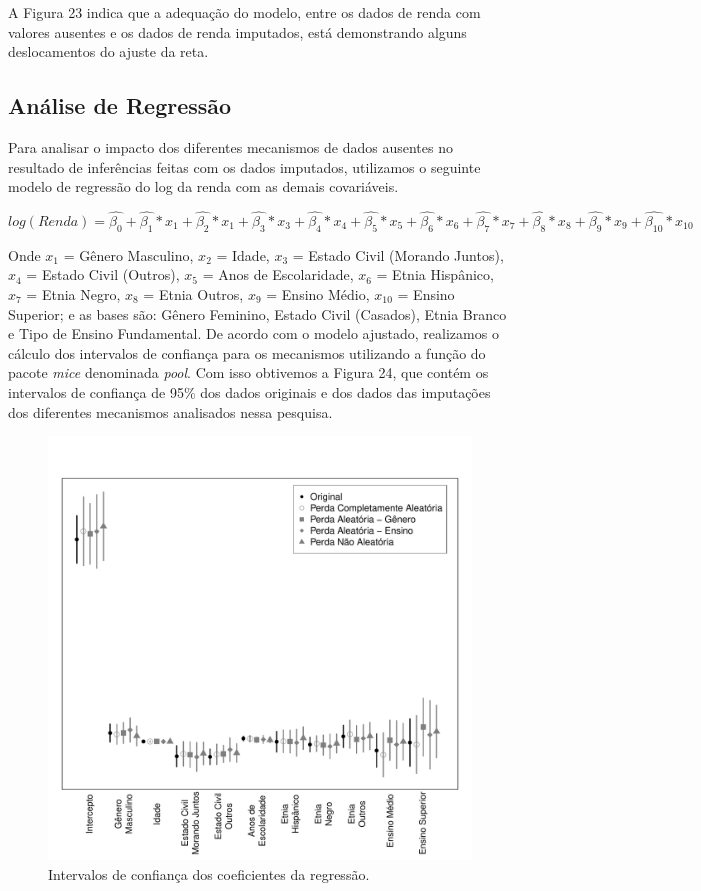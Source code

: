 \documentclass[]{article}
\begin{document}
A Figura 23 indica que a adequação do modelo, entre os dados de renda
com valores ausentes e os dados de renda imputados, está demonstrando
alguns deslocamentos do ajuste da reta.

\subsection{Análise de Regressão}\label{analise-de-regressao}

Para analisar o impacto dos diferentes mecanismos de dados ausentes no
resultado de inferências feitas com os dados imputados, utilizamos o
seguinte modelo de regressão do log da renda com as demais covariáveis.

\[log(Renda)=\hat{\beta_0}+\hat{\beta_1}*x_1+\hat{\beta_2}*x_1+\hat{\beta_3}*x_3+\hat{\beta_4}*x_4+\hat{\beta_5}*x_5+\hat{\beta_6}*x_6+\hat{\beta_7}*x_7+\hat{\beta_8}*x_8+\hat{\beta_9}*x_9+\hat{\beta_{10}}*x_{10}\]

Onde \(x_1\) = Gênero Masculino, \(x_2\) = Idade, \(x_3\) = Estado Civil
(Morando Juntos), \(x_4\) = Estado Civil (Outros), \(x_5\) = Anos de
Escolaridade, \(x_6\) = Etnia Hispânico, \(x_7\) = Etnia Negro, \(x_8\)
= Etnia Outros, \(x_9\) = Ensino Médio, \(x_{10}\) = Ensino Superior; e
as bases são: Gênero Feminino, Estado Civil (Casados), Etnia Branco e
Tipo de Ensino Fundamental. De acordo com o modelo ajustado, realizamos
o cálculo dos intervalos de confiança para os mecanismos utilizando a
função do pacote \emph{mice} denominada \emph{pool}. Com isso obtivemos
a Figura 24, que contém os intervalos de confiança de 95\% dos dados
originais e dos dados das imputações dos diferentes mecanismos
analisados nessa pesquisa.

\begin{figure}[H]

{\centering \includegraphics[width=0.6\linewidth]{reg-graf} 

}

\caption{Intervalos de confiança dos coeficientes da regressão.}\label{fig:unnamed-chunk-33}
\end{figure}
\end{document}
